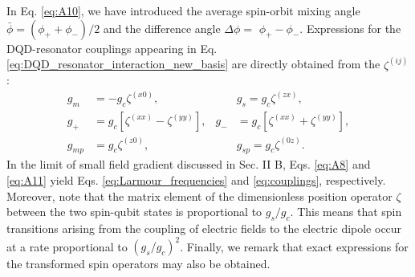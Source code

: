 \documentclass[12pt]{article}
\begin{document}
In Eq. \ref{eq:A10}, we have introduced the average spin-orbit mixing angle $\bar{\phi}=\left(\phi_{+}+\phi_{-}\right) / 2$ and the difference angle $\Delta \phi=$ $\phi_{+}-\phi_{-}$. 
Expressions for the DQD-resonator couplings appearing in Eq. \ref{eq:DQD_resonator_interaction_new_basis} are directly obtained from the $\zeta^{(i j)}$ :
\begin{equation}\label{eq:A11}
    \begin{aligned}
        g_m & =-g_c \zeta^{(x 0)}, & & g_s=g_c \zeta^{(z x)}, \\
        g_{+} & =g_c\left[\zeta^{(x x)}-\zeta^{(y y)}\right], & g_{-} & =g_c\left[\zeta^{(x x)}+\zeta^{(y y)}\right], \\
        g_{m p} & =g_c \zeta^{(z 0)}, & & g_{s p}=g_c \zeta^{(0 z)} .
        \end{aligned}
\end{equation}
In the limit of small field gradient discussed in Sec. II B, Eqs. \ref{eq:A8} and \ref{eq:A11} yield Eqs. \ref{eq:Larmour_frequencies} and \ref{eq:couplings}, respectively. 
Moreover, note that the matrix element of the dimensionless position operator $\zeta$ between the two spin-qubit states is proportional to $g_s / g_c$. 
This means that spin transitions arising from the coupling of electric fields to the electric dipole occur at a rate proportional to $\left(g_s / g_c\right)^2$. 
Finally, we remark that exact expressions for the transformed spin operators may also be obtained.


\end{document}
